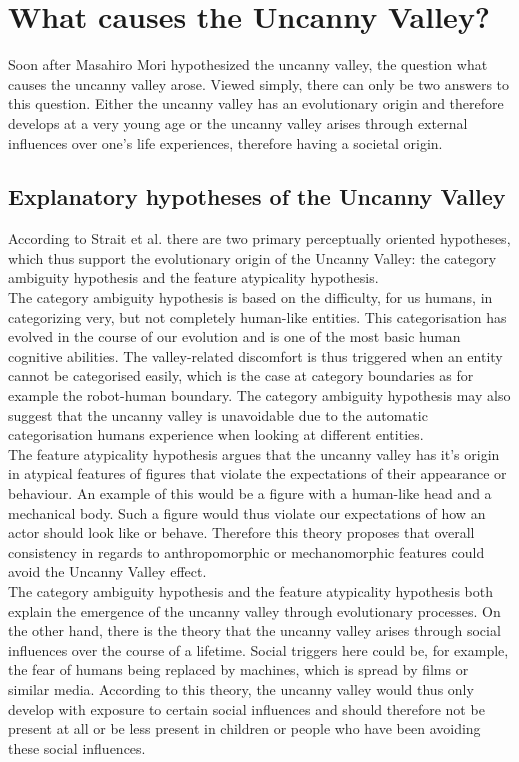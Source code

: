 \chapter{What causes the Uncanny Valley?}   
Soon after Masahiro Mori hypothesized the uncanny valley, the question what causes the uncanny valley arose. Viewed simply, there can only be two answers to this question. Either the uncanny valley has an evolutionary origin and therefore develops at a very young age or the uncanny valley arises through external influences over one's life experiences, therefore having a societal origin. 
\section{Explanatory hypotheses of the Uncanny Valley}
According to Strait et al. \cite{childrens_responding} there are two primary perceptually oriented hypotheses, which thus support the evolutionary origin of the Uncanny Valley: the category ambiguity hypothesis and the feature atypicality hypothesis.\\
The category ambiguity hypothesis \cite{childrens_responding} is based on the difficulty, for us humans, in categorizing very, but not completely human-like entities. This categorisation has evolved in the course of our evolution and is one of the
most basic human cognitive abilities. The valley-related discomfort is thus triggered when an entity cannot be categorised easily, which is the case at category boundaries as for example the robot-human boundary. The category ambiguity hypothesis may also suggest that the uncanny valley is unavoidable due to the automatic categorisation humans experience when looking at different entities.\\
The feature atypicality hypothesis \cite{childrens_responding} argues that the uncanny valley has it's origin in atypical features of figures that violate the expectations of their appearance or behaviour. An example of this would be a figure with a human-like head and a mechanical body. Such a figure would thus violate our expectations of how an actor should look like or behave. Therefore this theory proposes that overall consistency in regards to anthropomorphic or mechanomorphic features could avoid the Uncanny Valley effect.\\
The category ambiguity hypothesis and the feature atypicality hypothesis both explain the emergence of the uncanny valley through evolutionary processes. On the other hand, there is the theory that the uncanny valley arises through social influences over the course of a lifetime. Social triggers here could be, for example, the fear of humans being replaced by machines, which is spread by films or similar media. According to this theory, the uncanny valley would thus only develop with exposure to certain social influences and should therefore not be present at all or be less present in children or people who have been avoiding these social influences. 

